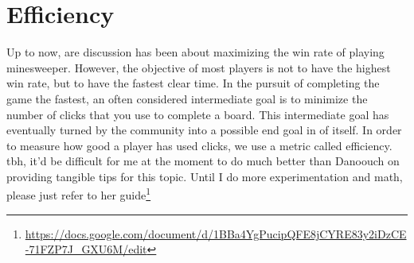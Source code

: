 \chapter{Efficiency}\label{sec:efficiency}

Up to now, are discussion has been about maximizing the win rate of playing minesweeper. However, the objective of most players is not to have the highest win rate, but to have the fastest clear time. In the pursuit of completing the game the fastest, an often considered intermediate goal is to minimize the number of clicks that you use to complete a board. This intermediate goal has eventually turned by the community into a possible end goal in of itself. In order to measure how good a player has used clicks, we use a metric called efficiency.\\







tbh, it'd be difficult for me at the moment to do much better than Danoouch on providing tangible tips for this topic. Until I do more experimentation and math, please just refer to her guide\footnote{\url{https://docs.google.com/document/d/1BBa4YgPucipQFE8jCYRE83y2iDzCE-71FZP7J_GXU6M/edit}}